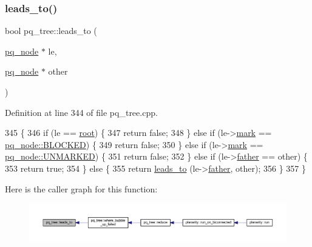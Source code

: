\subsubsection{\texorpdfstring{leads\+\_\+to()}{leads\_to()}}
{\footnotesize\ttfamily bool pq\+\_\+tree\+::leads\+\_\+to (\begin{DoxyParamCaption}\item[{\mbox{\hyperlink{classpq__node}{pq\+\_\+node}} $\ast$}]{le,  }\item[{\mbox{\hyperlink{classpq__node}{pq\+\_\+node}} $\ast$}]{other }\end{DoxyParamCaption})\hspace{0.3cm}{\ttfamily [private]}}



Definition at line 344 of file pq\+\_\+tree.\+cpp.


\begin{DoxyCode}
345 \{
346     \textcolor{keywordflow}{if} (le == \mbox{\hyperlink{classpq__tree_ad8e4e2235fe68fb99769cec54e1760ba}{root}}) \{
347     \textcolor{keywordflow}{return} \textcolor{keyword}{false};
348     \} \textcolor{keywordflow}{else} \textcolor{keywordflow}{if} (le->\mbox{\hyperlink{classpq__node_aee913582a7b268ce2570bee8a8367c50}{mark}} == \mbox{\hyperlink{classpq__node_a6236b20cd5f6cc02cb5f637ed34c96d9a70312622ded9f04f068838ec195fc53c}{pq\_node::BLOCKED}}) \{
349     \textcolor{keywordflow}{return} \textcolor{keyword}{false};
350     \} \textcolor{keywordflow}{else} \textcolor{keywordflow}{if} (le->\mbox{\hyperlink{classpq__node_aee913582a7b268ce2570bee8a8367c50}{mark}} == \mbox{\hyperlink{classpq__node_a6236b20cd5f6cc02cb5f637ed34c96d9a7fbe5f6a363f9f2b5a154c61b2389d59}{pq\_node::UNMARKED}}) \{
351     \textcolor{keywordflow}{return} \textcolor{keyword}{false};
352     \} \textcolor{keywordflow}{else} \textcolor{keywordflow}{if} (le->\mbox{\hyperlink{classpq__node_a3e7c886498c76c633f057fb42ff9c435}{father}} == other) \{
353     \textcolor{keywordflow}{return} \textcolor{keyword}{true};
354     \} \textcolor{keywordflow}{else} \{
355     \textcolor{keywordflow}{return} \mbox{\hyperlink{classpq__tree_aa2c33ce6225a761119a1ea00b91753db}{leads\_to}} (le->\mbox{\hyperlink{classpq__node_a3e7c886498c76c633f057fb42ff9c435}{father}}, other);
356     \}
357 \}
\end{DoxyCode}
Here is the caller graph for this function\+:\nopagebreak
\begin{figure}[H]
\begin{center}
\leavevmode
\includegraphics[width=350pt]{classpq__tree_aa2c33ce6225a761119a1ea00b91753db_icgraph}
\end{center}
\end{figure}
\mbox{\label{classpq__tree_adf4c0caf846fd0c5d793e4797ec46e3e}} 
